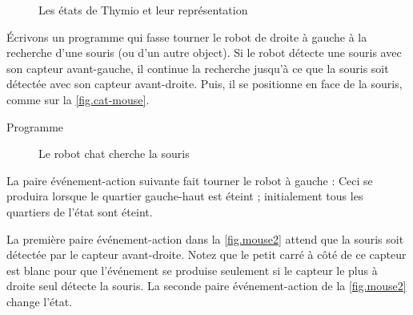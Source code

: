 

\begin{figure}
	\hfill
	\caption{Les états de Thymio et leur représentation}
\end{figure}


Écrivons un programme qui fasse tourner le robot de droite à gauche à la recherche d'une souris (ou d'un autre object).
Si le robot détecte une souris avec son capteur avant-gauche, il continue la recherche jusqu'à ce que la souris soit détectée avec son capteur avant-droite.
Puis, il se positionne en face de la souris, comme sur la \cref{fig.cat-mouse}.

{\raggedleft \hfill Programme }

\begin{figure}
	\hfill
	\caption{Le robot chat cherche la souris}
\end{figure}

La paire événement-action suivante fait tourner le robot à gauche : 
Ceci se produira lorsque le quartier gauche-haut est éteint ; initialement tous les quartiers de l'état sont éteint.

La première paire événement-action dans la \cref{fig.mouse2} attend que la souris soit détectée par le capteur avant-droite.
Notez que le petit carré à côté de ce capteur est blanc pour que l'événement se produise seulement si le capteur le plus à droite seul détecte la souris.
La seconde paire événement-action de la \cref{fig.mouse2} change l'état.


